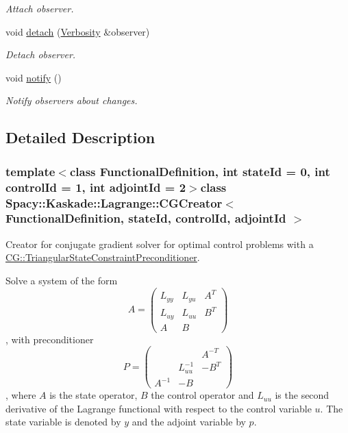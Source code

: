 \begin{DoxyCompactItemize}
\begin{DoxyCompactList}\small\item\em Attach observer. \end{DoxyCompactList}\item 
\hypertarget{classSpacy_1_1Mixin_1_1MixinConnection_adda739590c487679c26f60e50aedb73f}{void \hyperlink{classSpacy_1_1Mixin_1_1MixinConnection_adda739590c487679c26f60e50aedb73f}{detach} (\hyperlink{classSpacy_1_1Mixin_1_1Verbosity_aefe2f237b0456c4bced001fbfa75f92e}{Verbosity} \&observer)}\label{classSpacy_1_1Mixin_1_1MixinConnection_adda739590c487679c26f60e50aedb73f}

\begin{DoxyCompactList}\small\item\em Detach observer. \end{DoxyCompactList}\item 
\hypertarget{classSpacy_1_1Mixin_1_1MixinConnection_a1ddeaa78a3bb4a38c2cca36d1f99fe36}{void \hyperlink{classSpacy_1_1Mixin_1_1MixinConnection_a1ddeaa78a3bb4a38c2cca36d1f99fe36}{notify} ()}\label{classSpacy_1_1Mixin_1_1MixinConnection_a1ddeaa78a3bb4a38c2cca36d1f99fe36}

\begin{DoxyCompactList}\small\item\em Notify observers about changes. \end{DoxyCompactList}\end{DoxyCompactItemize}


\subsection{Detailed Description}
\subsubsection*{template$<$class Functional\-Definition, int state\-Id = 0, int control\-Id = 1, int adjoint\-Id = 2$>$class Spacy\-::\-Kaskade\-::\-Lagrange\-::\-C\-G\-Creator$<$ Functional\-Definition, state\-Id, control\-Id, adjoint\-Id $>$}

Creator for conjugate gradient solver for optimal control problems with a \hyperlink{classSpacy_1_1CG_1_1TriangularStateConstraintPreconditioner}{C\-G\-::\-Triangular\-State\-Constraint\-Preconditioner}. 

Solve a system of the form \[ A = \left( \begin{array}{ccc} L_{yy} & L_{yu} & A^T \\ L_{uy} & L_{uu} & B^T \\ A & B & \end{array} \right)\], with preconditioner \[ P = \left( \begin{array}{ccc} & & A^{-T} \\ & L_{uu}^{-1} & -B^T \\ A^{-1} & -B & \end{array} \right)\], where $A$ is the state operator, $B$ the control operator and $L_{uu}$ is the second derivative of the Lagrange functional with respect to the control variable $u$. The state variable is denoted by $y$ and the adjoint variable by $p$.


